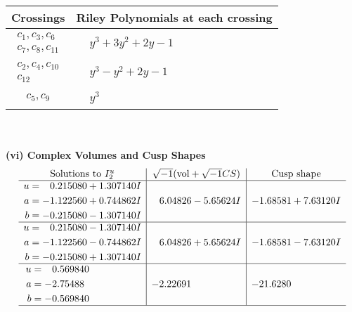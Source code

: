 \documentclass[1p]{elsarticle_modified}
\theoremstyle{definition}
\newcommand{\I}{\sqrt{-1}}
\begin{document}
\begin{tabular}{m{50pt}|m{274pt}}
Crossings & \hspace{64pt}Riley Polynomials at each crossing \\
\hline $$\begin{aligned}c_{1},c_{3},c_{6}\\c_{7},c_{8},c_{11}\end{aligned}$$&$\begin{aligned}
&y^3+3 y^2+2 y-1
\end{aligned}$\\
\hline $$\begin{aligned}c_{2},c_{4},c_{10}\\c_{12}\end{aligned}$$&$\begin{aligned}
&y^3- y^2+2 y-1
\end{aligned}$\\
\hline $$\begin{aligned}c_{5},c_{9}\end{aligned}$$&$\begin{aligned}
&y^3
\end{aligned}$\\
\hline
\end{tabular}\\~\\
\newpage\flushleft \textbf{(vi) Complex Volumes and Cusp Shapes}
$$\begin{array}{c|c|c}  
\text{Solutions to }I^u_{2}& \I (\text{vol} + \sqrt{-1}CS) & \text{Cusp shape}\\
 \hline 
\begin{aligned}
u &= \phantom{-}0.215080 + 1.307140 I \\
a &= -1.122560 + 0.744862 I \\
b &= -0.215080 - 1.307140 I\end{aligned}
 & \phantom{-}6.04826 - 5.65624 I & -1.68581 + 7.63120 I \\ \hline\begin{aligned}
u &= \phantom{-}0.215080 - 1.307140 I \\
a &= -1.122560 - 0.744862 I \\
b &= -0.215080 + 1.307140 I\end{aligned}
 & \phantom{-}6.04826 + 5.65624 I & -1.68581 - 7.63120 I \\ \hline\begin{aligned}
u &= \phantom{-}0.569840\phantom{ +0.000000I} \\
a &= -2.75488\phantom{ +0.000000I} \\
b &= -0.569840\phantom{ +0.000000I}\end{aligned}
 & -2.22691\phantom{ +0.000000I} & -21.6280\phantom{ +0.000000I}\\
 \hline 
 \end{array}$$\newpage\newpage\renewcommand{\arraystretch}{1}
\end{document}
